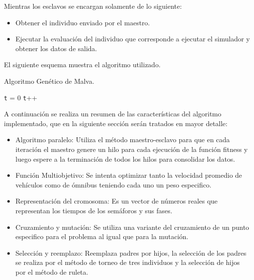 Mientras los esclavos se encargan solamente de lo siguiente:
\begin{itemize}
	\item Obtener el individuo enviado por el maestro.
	\item Ejecutar la evaluación del individuo que corresponde a ejecutar el simulador y obtener los datos de salida.
\end{itemize}


El siguiente esquema muestra el algoritmo utilizado. 

\begin{algorithm}[H]
	\caption{Algoritmo Genético de Malva. }
	\label{alg:algoritmo_genetico_malva}
	\begin{algorithmic} [1] 
		{
			\STATE \texttt{t} = 0
			\STATE \texttt{t}++		
			\ENDWHILE
		}
	\end{algorithmic}
	
\end{algorithm}

A continuación se realiza un resumen de las características del algoritmo implementado, que en la siguiente sección serán tratados en mayor detalle:
\begin{itemize}

\item Algoritmo paralelo: Utiliza el método maestro-esclavo para que en cada iteración el maestro genere un hilo para cada ejecución  de la función fitness y luego espere a la terminación de todos los hilos para consolidar los datos. 
\item Función Multiobjetivo: Se intenta optimizar tanto la velocidad promedio de vehículos como de ómnibus teniendo cada uno un peso especifico.
\item Representación del cromosoma: Es un vector de números reales que representan los tiempos de los semáforos y sus fases.
\item Cruzamiento y mutación: Se utiliza una variante del cruzamiento de un punto especifico para el problema al igual que para la mutación.
\item Selección y reemplazo: Reemplaza padres por hijos, la selección de los padres se realiza por el método de torneo de tres individuos y la selección de hijos por el método de ruleta.

\end{itemize}

